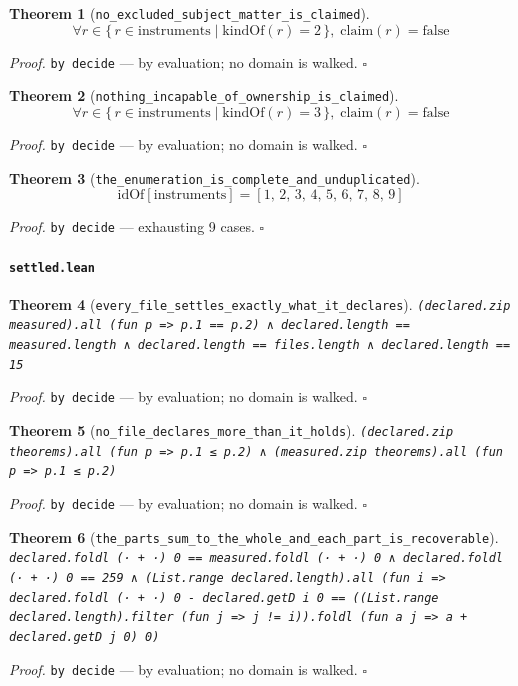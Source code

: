 \documentclass[11pt]{article}
\newtheorem{theorem}{Theorem}[section]
\begin{document}
\begin{theorem}[\texttt{no\_excluded\_subject\_matter\_is\_claimed}]
\[ \forall r \in \{\, r \in \mathrm{instruments} \mid \mathrm{kindOf}\mathopen{}\left(r\right) = 2 \,\},\; \mathrm{claim}\mathopen{}\left(r\right) = \mathrm{false} \]
\end{theorem}
\noindent\emph{Proof.} \texttt{by decide} --- by evaluation; no domain is walked. \hfill$\square$

\begin{theorem}[\texttt{nothing\_incapable\_of\_ownership\_is\_claimed}]
\[ \forall r \in \{\, r \in \mathrm{instruments} \mid \mathrm{kindOf}\mathopen{}\left(r\right) = 3 \,\},\; \mathrm{claim}\mathopen{}\left(r\right) = \mathrm{false} \]
\end{theorem}
\noindent\emph{Proof.} \texttt{by decide} --- by evaluation; no domain is walked. \hfill$\square$

\begin{theorem}[\texttt{the\_enumeration\_is\_complete\_and\_unduplicated}]
\[ \mathrm{idOf}[\mathrm{instruments}] = [1,\,2,\,3,\,4,\,5,\,6,\,7,\,8,\,9] \]
\end{theorem}
\noindent\emph{Proof.} \texttt{by decide} --- exhausting 9 cases. \hfill$\square$

\paragraph{\texttt{settled.lean}}

\begin{theorem}[\texttt{every\_file\_settles\_exactly\_what\_it\_declares}]
\texttt{(declared.zip measured).all (fun p => p.1 == p.2) ∧ declared.length == measured.length ∧ declared.length == files.length ∧ declared.length == 15}
\end{theorem}
\noindent\emph{Proof.} \texttt{by decide} --- by evaluation; no domain is walked. \hfill$\square$

\begin{theorem}[\texttt{no\_file\_declares\_more\_than\_it\_holds}]
\texttt{(declared.zip theorems).all (fun p => p.1 ≤ p.2) ∧ (measured.zip theorems).all (fun p => p.1 ≤ p.2)}
\end{theorem}
\noindent\emph{Proof.} \texttt{by decide} --- by evaluation; no domain is walked. \hfill$\square$

\begin{theorem}[\texttt{the\_parts\_sum\_to\_the\_whole\_and\_each\_part\_is\_recoverable}]
\texttt{declared.foldl (· + ·) 0 == measured.foldl (· + ·) 0 ∧ declared.foldl (· + ·) 0 == 259 ∧ (List.range declared.length).all (fun i => declared.foldl (· + ·) 0 - declared.getD i 0 == ((List.range declared.length).filter (fun j => j != i)).foldl (fun a j => a + declared.getD j 0) 0)}
\end{theorem}
\noindent\emph{Proof.} \texttt{by decide} --- by evaluation; no domain is walked. \hfill$\square$
\end{document}

